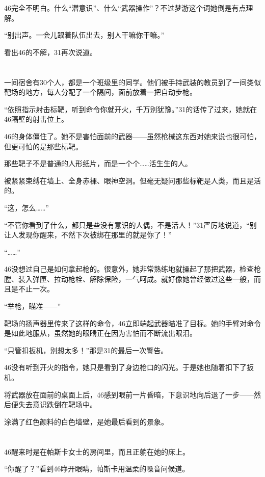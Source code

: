 46完全不明白。什么“潜意识”、什么“武器操作”？不过梦游这个词她倒是有点理解。

“别出声。一会儿跟着队伍出去，别人干嘛你干嘛。”

看出46的不解，31再次说道。

\section*{}

一间宿舍有30个人，都是一个班级里的同学。他们被手持武装的教员到了一间类似靶场的地方，每人分配了一个隔间，面前放着一把自动步枪。

“依照指示射击标靶，听到命令你就开火，千万别犹豫。”31的话传了过来，她就在46隔壁的射击位上。

46的身体僵住了。她不是害怕面前的武器——虽然枪械这东西对她来说也很可怕，但更可怕的是那些标靶。

那些靶子不是普通的人形纸片，而是一个个……活生生的人。

被紧紧束缚在墙上、全身赤裸、眼神空洞。但毫无疑问那些标靶是人类，而且是活的。

“这，怎么……”

“不管你看到了什么，都只是些没有意识的人偶，不是活人！”31严厉地说道，“别让人发现你醒来，不然下次被绑在那里的就是你了！”

“……”

46没想过自己是如何拿起枪的。很意外，她非常熟练地就操起了那把武器，检查枪膛、装入弹匣、拉动枪栓、解除保险，一气呵成。就好像她曾经做过这些一般，而且是不止一次。

“举枪，瞄准——”

靶场的扬声器里传来了这样的命令，46立即端起武器瞄准了目标。她的手臂对命令是如此地服从，虽然她的眼睛正在因为害怕而不断流出眼泪。

“只管扣扳机，别想太多！”那是31的最后一次警告。

46没有听到开火的指令，她只是看到了身边枪口的闪光。于是她也随着扣下了扳机。

将武器放在面前的桌面上后，46感到眼前一片昏暗，下意识地向后退了一步——然后便失去意识跌倒在靶场中。

涂满了红色颜料的白色墙壁，是她最后看到的景象。

\section*{}

46醒来时是在帕斯卡女士的房间里，而且正躺在她的床上。

“你醒了？”看到46睁开眼睛，帕斯卡用温柔的嗓音问候道。

